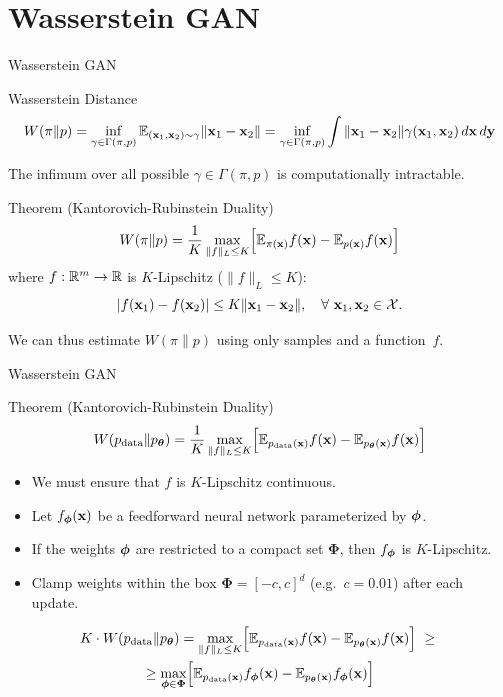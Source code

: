 \documentclass{beamer}
\begin{document}
\section{Wasserstein GAN}
\begin{frame}{Wasserstein GAN}
	\begin{block}{Wasserstein Distance}
		\vspace{-0.5cm}
		\[
		W(\pi \| p) = \inf_{\gamma \in \Gamma(\pi, p)} \mathbb{E}_{(\mathbf{x}_1, \mathbf{x}_2) \sim \gamma} \| \mathbf{x}_1 - \mathbf{x}_2 \| =  \inf_{\gamma \in \Gamma(\pi, p)} \int \|\mathbf{x}_1 - \mathbf{x}_2\| \gamma (\mathbf{x}_1, \mathbf{x}_2)\, d\mathbf{x}\, d\mathbf{y}
		\]
		\vspace{-0.3cm}
	\end{block}
	\eqpause
	The infimum over all possible $\gamma \in \Gamma(\pi, p)$ is computationally intractable.
	\eqpause
	\begin{block}{Theorem (Kantorovich-Rubinstein Duality)}
		\vspace{-0.3cm}
		\[
			W(\pi \| p) = \frac{1}{K} \max_{\| f \|_L \leq K} \Bigl[ \mathbb{E}_{\pi(\mathbf{x})} f(\mathbf{x})  - \mathbb{E}_{p(\mathbf{x})} f(\mathbf{x})\Bigr]
		\]
		where $f : \mathbb{R}^m \rightarrow \mathbb{R}$ is $K$-Lipschitz ($\|f\|_L \leq K$):
		\[
			|f(\mathbf{x}_1) - f(\mathbf{x}_2)| \leq K \|\mathbf{x}_1 - \mathbf{x}_2\|,\quad \forall\ \mathbf{x}_1, \mathbf{x}_2 \in \mathcal{X}.
		\]
		\vspace{-0.6cm}
	\end{block}
	\eqpause
	We can thus estimate $W(\pi \| p)$ using only samples and a function~$f$.
\end{frame}
\begin{frame}{Wasserstein GAN}
	\begin{block}{Theorem (Kantorovich-Rubinstein Duality)}
		\[
		W(p_{\text{data}} \| p_{\boldsymbol{\theta}}) = \frac{1}{K} \max_{\| f \|_L \leq K} \Bigl[ \mathbb{E}_{p_{\text{data}}(\mathbf{x})} f(\mathbf{x})  - \mathbb{E}_{p_{\boldsymbol{\theta}}(\mathbf{x})} f(\mathbf{x})\Bigr]
		\]
	\end{block}
	\begin{itemize}
		\item We must ensure that $f$ is $K$-Lipschitz continuous.
		\item Let $f_{\boldsymbol{\phi}}(\mathbf{x})$ be a feedforward neural network parameterized by $\boldsymbol{\phi}$.
		\item If the weights $\boldsymbol{\phi}$ are restricted to a compact set $\boldsymbol{\Phi}$, then $f_{\boldsymbol{\phi}}$ is $K$-Lipschitz.
		\eqpause
		\item Clamp weights within the box $\boldsymbol{\Phi} = [-c, c]^d$ (e.g.\ $c = 0.01$) after each update.
	\end{itemize}
	\begin{multline*}
		K \cdot W(\pd \| \pt) = \max_{\| f \|_L \leq K} \Bigl[ \bbE_{\pd(\bx)} f(\bx)  - \bbE_{\pt(\bx)} f(\bx)\Bigr]\ \geq\ 
		\\  \geq \max_{\bphi \in \boldsymbol{\Phi}} \Bigl[ \bbE_{\pd(\bx)} f_{\bphi}(\bx)  - \bbE_{\pt(\bx)} f_{\bphi}(\bx)\Bigr]
	\end{multline*}
\end{frame}
\end{document}
